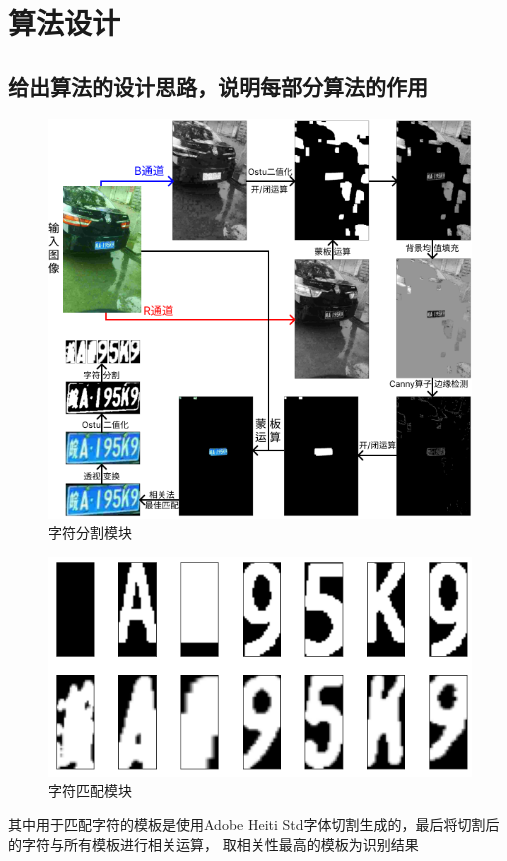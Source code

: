 \documentclass[a4paper]{ctexart}
\begin{document}
  \section{算法设计}
    \subsection{给出算法的设计思路，说明每部分算法的作用}
    \begin{figure}[H]
      \includegraphics*[width=1.0\textwidth]{rep/frame1.png}
      \caption{字符分割模块}
    \end{figure}
    \begin{figure}[H]
      \includegraphics*[width=1.0\textwidth]{rep/match.png}
      \caption{字符匹配模块}
    \end{figure}
    其中用于匹配字符的模板是使用Adobe Heiti Std字体切割生成的，最后将切割后的字符与所有模板进行相关运算，
    取相关性最高的模板为识别结果
\end{document}
